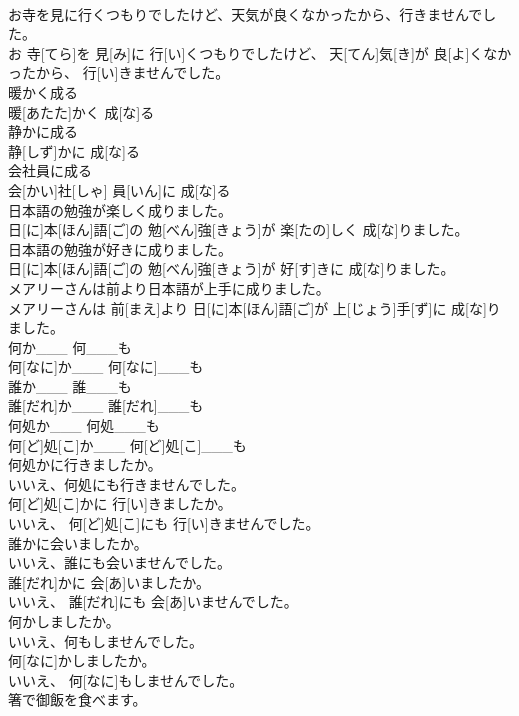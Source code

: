 \documentclass[8pt]{extreport}
\begin{document}
\begin{CJK}{UTF8}{min}
\\	お寺を見に行くつもりでしたけど、天気が良くなかったから、行きませんでした。	
\\	お 寺[てら]を 見[み]に 行[い]くつもりでしたけど、 天[てん]気[き]が 良[よ]くなかったから、 行[い]きませんでした。
\\	暖かく成る	
\\	暖[あたた]かく 成[な]る
\\	静かに成る	
\\	静[しず]かに 成[な]る
\\	会社員に成る	
\\	会[かい]社[しゃ] 員[いん]に 成[な]る
\\	日本語の勉強が楽しく成りました。	
\\	日[に]本[ほん]語[ご]の 勉[べん]強[きょう]が 楽[たの]しく 成[な]りました。
\\	日本語の勉強が好きに成りました。	
\\	日[に]本[ほん]語[ご]の 勉[べん]強[きょう]が 好[す]きに 成[な]りました。
\\	メアリーさんは前より日本語が上手に成りました。	
\\	メアリーさんは 前[まえ]より 日[に]本[ほん]語[ご]が 上[じょう]手[ず]に 成[な]りました。
\\	何か___ 何___も	
\\	何[なに]か___ 何[なに]___も
\\	誰か___ 誰___も	
\\	誰[だれ]か___ 誰[だれ]___も
\\	何処か___ 何処___も	
\\	何[ど]処[こ]か___ 何[ど]処[こ]___も
\\	何処かに行きましたか。 
\\	いいえ、何処にも行きませんでした。	
\\	何[ど]処[こ]かに 行[い]きましたか。 
\\	いいえ、 何[ど]処[こ]にも 行[い]きませんでした。
\\	誰かに会いましたか。 
\\	いいえ、誰にも会いませんでした。	
\\	誰[だれ]かに 会[あ]いましたか。 
\\	いいえ、 誰[だれ]にも 会[あ]いませんでした。
\\	何かしましたか。 
\\	いいえ、何もしませんでした。	
\\	何[なに]かしましたか。 
\\	いいえ、 何[なに]もしませんでした。
\\	箸で御飯を食べます。	

\end{CJK}
\end{document}
